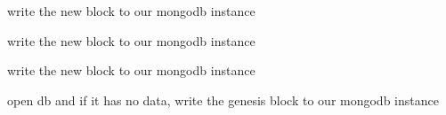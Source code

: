 
\begin{DoxyRefList}
\item[Member \mbox{\hyperlink{class_node_ac08fe080956d22ded0226fd3b47a4fdc}{Node\+::forge}} ()]\label{todo__todo000003}%
%
write the new block to our mongodb instance  
\item[Member \mbox{\hyperlink{class_node_ae1918e440c28994f9fd8343d5bc0c429}{Node\+::handle\+Block}} (\mbox{\hyperlink{class_block}{Block}} block, bool broadcast)]\label{todo__todo000001}%
%
write the new block to our mongodb instance  
\item[Member \mbox{\hyperlink{class_node_adbc4873aa5493cdea93bbc2a24354da2}{Node\+::handle\+Blockchain}} (std\+::string blockchain\+String)]\label{todo__todo000002}%
%
write the new block to our mongodb instance  
\item[Member \mbox{\hyperlink{class_socket_communication_a9d8cebb7b8a9fdc343d63de5e8b78162}{Socket\+Communication\+::start\+P2\+PServer}} (int argc, char $\ast$$\ast$argv)]\label{todo__todo000004}%
%
open db and if it has no data, write the genesis block to our mongodb instance 
\end{DoxyRefList}